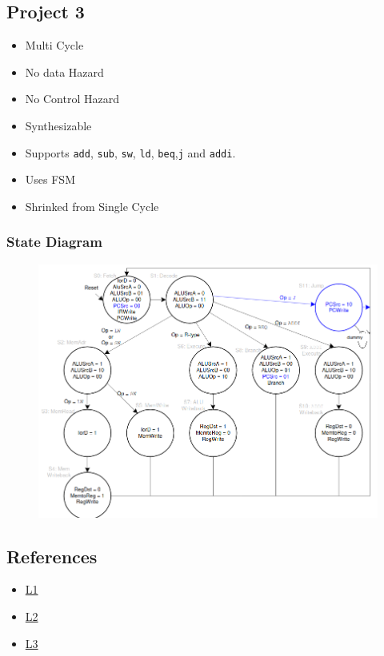 \documentclass{article}
\begin{document}
\subsection*{Project 3}

\begin{itemize}
    \item Multi Cycle
    \item No data Hazard
    \item No Control Hazard
    \item Synthesizable
    \item Supports \verb|add|, \verb|sub|, \verb|sw|, \verb|ld|, \verb|beq|,\verb|j| and \verb|addi|.
    \item Uses FSM
    \item Shrinked from Single Cycle
\end{itemize}
\subsubsection*{State Diagram}
\begin{figure}[H]
    \begin{center}
        \includegraphics[scale=0.5]{MultiCycleImplementation/MISPImplementationFSM_JUMP.png}
    \end{center}
\end{figure}


\subsection*{References}
\begin{itemize}
    \item \href{https://syssec.ethz.ch/content/dam/ethz/special-interest/infk/inst-infsec/system-security-group-dam/education/Digitaltechnik_14/21_Architecture_MultiCycle.pdf}{L1}
    \item \href{https://nptel.ac.in/courses/106/102/106102062/#downloads}{L2}
    \item \href{https://www.cs.fsu.edu/~zwang/files/cda3101/Fall2017/Lecture6_cda3101.pdf}{L3}
\end{itemize}
\end{document}
